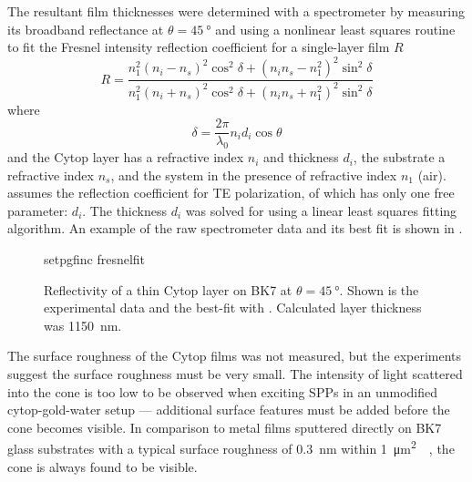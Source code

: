 The resultant film thicknesses were determined with a spectrometer by
measuring its broadband reflectance at $\theta=\SI{45}{\degree}$ and using
a nonlinear least squares routine~\cite{more1977LevAlgImpThe_2} to
fit the Fresnel intensity reflection coefficient for a single-layer
film $R$~\cite{steck2006classical}
\begin{equation}
				R = \frac{n_1^2{(n_i-n_s)}^2 \cos^2\delta + {(n_i n_s - n_1^2)}^2\sin^2\delta}
				{n_1^2{(n_i+n_s)}^2 \cos^2\delta + {(n_i n_s + n_1^2)}^2\sin^2\delta}
          \label{eqn:fitfresnel}
\end{equation}
where
\begin{equation}
 \delta = \frac{2\pi}{\lambda_0} n_i d_i \cos \theta
\end{equation}
and the Cytop layer has a refractive index $n_i$ and thickness $d_i$, the
substrate a refractive index $n_s$, and the system in the presence of
refractive index $n_1$ (air).   assumes the
reflection coefficient for TE polarization, of which 
has only one free parameter: $d_i$.  The thickness $d_i$ was solved for using
a linear least squares fitting algorithm.  An example of the raw spectrometer
data and its best fit is shown in
.

\begin{figure}
 \centering
 {setpgfinc}
 {fresnelfit}
 \caption{Reflectivity of a thin Cytop layer on BK7 at
 $\theta=\SI{45}{\degree}$.  Shown is the experimental data and the
	best-fit with .  Calculated layer thickness was \SI{1150}{\nano\meter}.}
\label{fig:fresnelfit}
\end{figure}

The surface roughness of the Cytop films was not measured, but the experiments
suggest the surface roughness must be very small.  The intensity of light
scattered into the cone is too low to be observed when exciting SPPs in an
unmodified cytop-gold-water setup --- additional surface features must be
added before the cone becomes visible.  In comparison to metal films sputtered
directly on BK7 glass substrates with a typical surface roughness of
\SI{0.3}{\nano\meter} within
\SI{1}{\micro\meter\squared}~\cite{cheang2011study}~\cite{chiu2011optimizing},
the cone is always found to be visible.  
